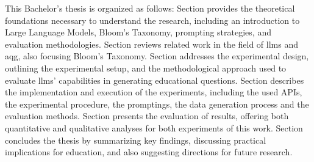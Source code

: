 This Bachelor's thesis is organized as follows:
Section  provides the theoretical foundations necessary to understand the research, including an introduction to Large Language Models, Bloom's Taxonomy, prompting strategies, and evaluation methodologies.
Section  reviews related work in the field of \ac{llms} and \ac{aqg}, also focusing Bloom's Taxonomy.
Section  addresses the experimental design, outlining the experimental setup, and the methodological approach used to evaluate \ac{llms}' capabilities in generating educational questions.
Section  describes the implementation and execution of the experiments, including the used APIs, the experimental procedure, the promptings, the data generation process and the evaluation methods.
Section  presents the evaluation of results, offering both quantitative and qualitative analyses for both experiments of this work.
Section  concludes the thesis by summarizing key findings, discussing practical implications for education, and also suggesting directions for future research.
